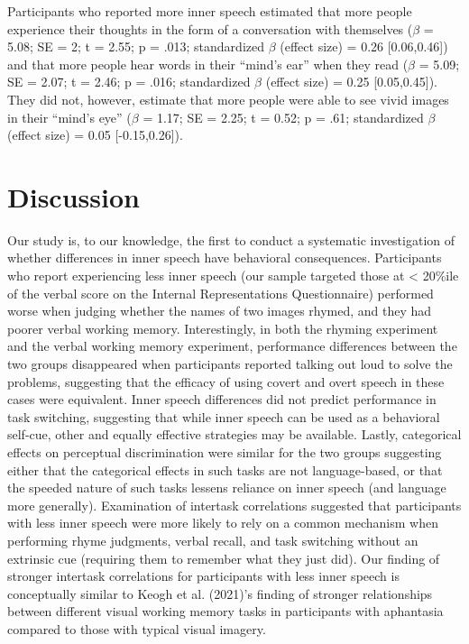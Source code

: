 \documentclass[
  man,a4paper,floatsintext]{apa6}
\begin{document}
Participants who reported more inner speech estimated that more people experience their thoughts in the form of a conversation with themselves (\(\beta\) = 5.08; SE = 2; t = 2.55; p = .013; standardized \(\beta\) (effect size) = 0.26 {[}0.06,0.46{]}) and that more people hear words in their ``mind's ear'' when they read (\(\beta\) = 5.09; SE = 2.07; t = 2.46; p = .016; standardized \(\beta\) (effect size) = 0.25 {[}0.05,0.45{]}). They did not, however, estimate that more people were able to see vivid images in their ``mind's eye'' (\(\beta\) = 1.17; SE = 2.25; t = 0.52; p = .61; standardized \(\beta\) (effect size) = 0.05 {[}-0.15,0.26{]}).

\hypertarget{discussion}{%
\section{Discussion}\label{discussion}}

Our study is, to our knowledge, the first to conduct a systematic investigation of whether differences in inner speech have behavioral consequences. Participants who report experiencing less inner speech (our sample targeted those at \textless{} 20\%ile of the verbal score on the Internal Representations Questionnaire) performed worse when judging whether the names of two images rhymed, and they had poorer verbal working memory. Interestingly, in both the rhyming experiment and the verbal working memory experiment, performance differences between the two groups disappeared when participants reported talking out loud to solve the problems, suggesting that the efficacy of using covert and overt speech in these cases were equivalent. Inner speech differences did not predict performance in task switching, suggesting that while inner speech can be used as a behavioral self-cue, other and equally effective strategies may be available. Lastly, categorical effects on perceptual discrimination were similar for the two groups suggesting either that the categorical effects in such tasks are not language-based, or that the speeded nature of such tasks lessens reliance on inner speech (and language more generally). Examination of intertask correlations suggested that participants with less inner speech were more likely to rely on a common mechanism when performing rhyme judgments, verbal recall, and task switching without an extrinsic cue (requiring them to remember what they just did). Our finding of stronger intertask correlations for participants with less inner speech is conceptually similar to Keogh et al. (2021)'s finding of stronger relationships between different visual working memory tasks in participants with aphantasia compared to those with typical visual imagery.
\end{document}
